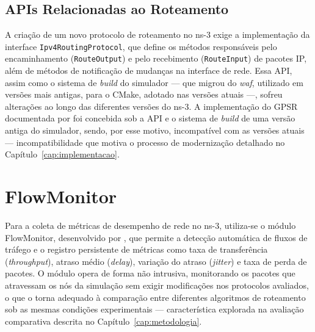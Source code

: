 \subsection{APIs Relacionadas ao Roteamento}
\label{sec:apis-roteamento}

A criação de um novo protocolo de roteamento no ns-3 exige a implementação da interface
\texttt{Ipv4RoutingProtocol}, que define os métodos responsáveis pelo encaminhamento
(\texttt{RouteOutput}) e pelo recebimento (\texttt{RouteInput}) de pacotes IP, além de
métodos de notificação de mudanças na interface de rede. Essa API, assim como o sistema de
\textit{build} do simulador — que migrou do \textit{waf}, utilizado em versões mais antigas,
para o CMake, adotado nas versões atuais —, sofreu alterações ao longo das diferentes versões
do ns-3. A implementação do GPSR documentada por
 foi concebida sob a API e o sistema de \textit{build}
de uma versão antiga do simulador, sendo, por esse motivo, incompatível com as versões atuais
— incompatibilidade que motiva o processo de modernização detalhado no
Capítulo~\ref{cap:implementacao}.

\section{FlowMonitor}
\label{sec:flowmonitor}

Para a coleta de métricas de desempenho de rede no ns-3, utiliza-se o módulo FlowMonitor,
desenvolvido por , que permite a detecção automática de
fluxos de tráfego e o registro persistente de métricas como taxa de transferência
(\textit{throughput}), atraso médio (\textit{delay}), variação do atraso (\textit{jitter}) e
taxa de perda de pacotes. O módulo opera de forma não intrusiva, monitorando os pacotes que
atravessam os nós da simulação sem exigir modificações nos protocolos avaliados, o que o
torna adequado à comparação entre diferentes algoritmos de roteamento sob as mesmas condições
experimentais — característica explorada na avaliação comparativa descrita no
Capítulo~\ref{cap:metodologia}.